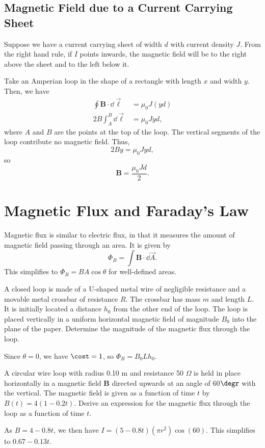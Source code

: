 \documentclass[11pt]{article}
\begin{document}
\subsection{Magnetic Field due to a Current Carrying Sheet}
Suppose we have a current carrying sheet of width $d$ with current density $J$. From the right hand rule, if $I$ points inwards, the magnetic field will be to the right above the sheet and to the left below it.

Take an Amperian loop in the shape of a rectangle with length $x$ and width $y$. Then, we have
\begin{align*}
    \oint \mathbf{B} \cdot \dd \vec{\ell} &= \mu_0 J(yd) \\
    2B\int_{A}^B \dd \vec{\ell} &= \mu_0 Jyd,
\end{align*}
where $A$ and $B$ are the points at the top of the loop. The vertical segments of the loop contribute no magnetic field. Thus,
\[2By = \mu_0 Jyd,\]
so
\begin{equation}
    \mathbf{B} = \frac{\mu_0 Jd}{2}.
\end{equation}

\section{Magnetic Flux and Faraday's Law}
Magnetic flux is similar to electric flux, in that it measures the amount of magnetic field passing through an area. It is given by
\begin{equation}
    \Phi_B = \int \mathbf{B} \cdot \dd \vec{A}.
\end{equation}
This simplifies to $\Phi_B = BA\cos\theta$ for well-defined areas.
\begin{example}[2012 E3]
    A closed loop is made of a U-shaped metal wire of negligible resistance and a movable metal crossbar of resistance $R$. The crossbar has mass $m$ and length $L$. It is initially located a distance $h_0$ from the other end of the loop. The loop is placed vertically in a uniform horizontal magnetic field of magnitude $B_0$ into the plane of the paper. Determine the magnitude of the magnetic flux through the loop.
\end{example}
\begin{solution}
    Since $\theta = 0$, we have $\cost = 1$, so $\Phi_B = B_0Lh_0$.    
\end{solution}
\begin{example}[2013 E3]\label{2013E3}
    A circular wire loop with radius 0.10 m and resistance 50 $\Omega$ is held in place horizontally in a magnetic field $\mathbf{B}$ directed upwards at an angle of 60$\degr$ with the vertical. The magnetic field is given as a function of time $t$ by $B(t) = 4(1-0.2t)$. Derive an expression for the magnetic flux through the loop as a function of time $t$.
\end{example}
\begin{solution}
    As $B = 4 - 0.8t$, we then have $I = (5-0.8t)(\pi r^2)\cos(60).$ This simplifies to $0.67 - 0.13t$.
\end{solution}
\end{document}
